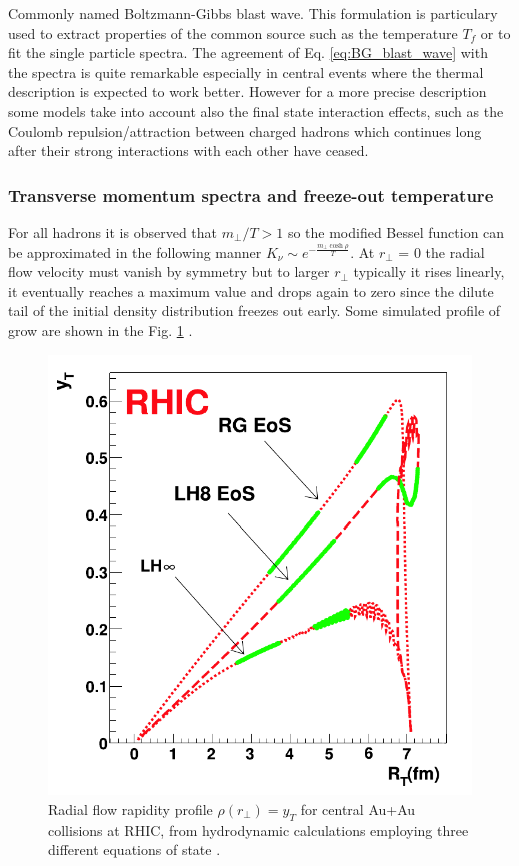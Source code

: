 \documentclass[12pt,a4paper]{book}
\begin{document}
	Commonly named Boltzmann-Gibbs blast wave. This formulation is particulary used to extract properties of the common source such as the temperature $T_f$ or to fit the single particle spectra. The agreement of Eq. \ref{eq:BG_blast_wave} with the spectra is quite remarkable especially in central events where the thermal description is expected to work better. However for a more precise description some models take into account also the final state interaction effects, such as the Coulomb repulsion/attraction between charged hadrons which continues long after their strong interactions with each other have ceased.
	
	
	\subsubsection{Transverse momentum spectra and freeze-out temperature}
	For all hadrons it is observed that $m_\perp/T >1$ so the modified Bessel function can be approximated in the following manner $K_\nu \sim e^{- \frac{m_\perp \cosh \rho}{T}}$.  At $r_\perp$ = 0 the radial flow velocity must vanish by symmetry but to larger $r_\perp$ typically it rises linearly, it eventually reaches a maximum value and drops again to zero since the dilute tail of the initial density distribution freezes out early. Some simulated profile of grow are shown in the Fig. \ref{fig:radial_flow} \cite{teaney2001hydrodynamicdescriptionheavyion}.
	
	\begin{figure}[ht]
		\centering
		\includegraphics[width=0.6\linewidth]{pictures/radial_flow.png}
		\caption{Radial flow rapidity profile $\rho(r_\perp)= y_T$ for central Au+Au collisions at RHIC, from hydrodynamic calculations employing three different equations of state \cite{EvolutionofcollisionsandQGP}.}
		\label{fig:radial_flow} 
	\end{figure}
	
\end{document}
